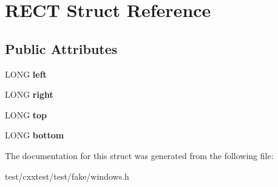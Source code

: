 \hypertarget{structRECT}{\section{R\-E\-C\-T Struct Reference}
\label{structRECT}
}
\subsection*{Public Attributes}
\begin{DoxyCompactItemize}
\item 
\hypertarget{structRECT_a1a8fdaa7531c5f7312eae129b965d87a}{L\-O\-N\-G {\bfseries left}}\label{structRECT_a1a8fdaa7531c5f7312eae129b965d87a}

\item 
\hypertarget{structRECT_acc4794b2dc15369ef0cd82811539a16f}{L\-O\-N\-G {\bfseries right}}\label{structRECT_acc4794b2dc15369ef0cd82811539a16f}

\item 
\hypertarget{structRECT_a45170a56eb6f2c881ebf8a1b09cc0f9c}{L\-O\-N\-G {\bfseries top}}\label{structRECT_a45170a56eb6f2c881ebf8a1b09cc0f9c}

\item 
\hypertarget{structRECT_a0c5789724662fefad4751dce9dc007b0}{L\-O\-N\-G {\bfseries bottom}}\label{structRECT_a0c5789724662fefad4751dce9dc007b0}

\end{DoxyCompactItemize}


The documentation for this struct was generated from the following file\-:\begin{DoxyCompactItemize}
\item 
test/cxxtest/test/fake/windows.\-h\end{DoxyCompactItemize}
